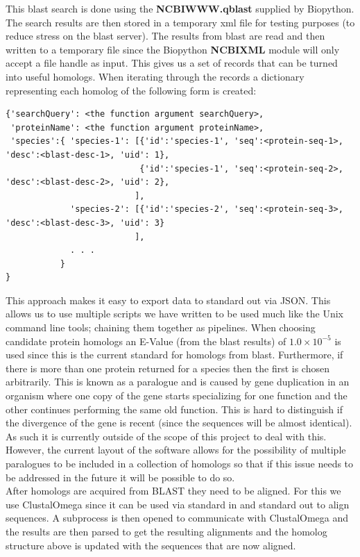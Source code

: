 \documentclass[11pt]{article}
\begin{document}
This blast search is done using the {\bf NCBIWWW.qblast} supplied by
Biopython. The search results are then stored in a temporary xml file
for testing purposes (to reduce stress on the blast server). The
results from blast are read and then written to a temporary file
since the Biopython {\bf NCBIXML} module will only accept a file
handle as input. This gives us a set of records that can be turned
into useful homologs. When iterating through the records a
dictionary representing each homolog of the following form is
created: \\
{\footnotesize
\begin{verbatim}
{'searchQuery': <the function argument searchQuery>,
 'proteinName': <the function argument proteinName>,
 'species':{ 'species-1': [{'id':'species-1', 'seq':<protein-seq-1>, 'desc':<blast-desc-1>, 'uid': 1},
                           {'id':'species-1', 'seq':<protein-seq-2>, 'desc':<blast-desc-2>, 'uid': 2},
                          ],
             'species-2': [{'id':'species-2', 'seq':<protein-seq-3>, 'desc':<blast-desc-3>, 'uid': 3}
                          ],
             . . .
           }
}
\end{verbatim}
}
This approach makes it easy to export data to standard out via
JSON. This allows us to use multiple scripts we have written to
be used much like the Unix command line tools; chaining them
together as pipelines. When choosing candidate protein homologs
an E-Value (from the blast results) of $1.0 \times 10^{-5}$ is used
since this is the current standard for homologs from blast. Furthermore, if
there is more than one protein returned for a species then the first
is chosen arbitrarily. This is known as a paralogue and is caused by
gene duplication in an organism where one copy of the gene starts
specializing for one function and the other continues performing the
same old function. This is hard to distinguish if the divergence of
the gene is recent (since the sequences will be almost identical). As
such it is currently outside of the scope of this project to deal with
this. However, the current layout of the software allows for the
possibility of multiple paralogues to be included in a collection of
homologs so that if this issue needs to be addressed in the future it
will be possible to do so. \\

After homologs are acquired from BLAST they need to be aligned. For
this we use ClustalOmega since it can be used via standard in and
standard out to align sequences. A subprocess is then opened to
communicate with ClustalOmega and the results are then parsed to get
the resulting alignments and the homolog structure above is updated
with the sequences that are now aligned. \\
\end{document}

